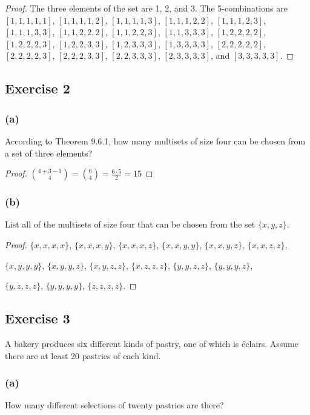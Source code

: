 \documentclass[14pt]{extarticle}
\begin{document}
\begin{proof}
The three elements of the set are 1, 2, and 3. The 5-combinations are \([1, 1, 1, 1, 1]\), \([1, 1, 1, 1, 2]\), 
\([1, 1, 1, 1, 3]\), \([1, 1, 1, 2, 2]\), \([1, 1, 1, 2, 3]\), \([1, 1, 1, 3, 3]\), \([1, 1, 2, 2, 2]\), \([1, 1, 2, 2, 3]\), 
\([1, 1, 3, 3, 3]\), \([1, 2, 2, 2, 2]\), \([1, 2, 2, 2, 3]\), \([1, 2, 2, 3, 3]\), \([1, 2, 3, 3, 3]\), \([1, 3, 3, 3, 3]\), 
\([2, 2, 2, 2, 2]\), \([2, 2, 2, 2, 3]\), \([2, 2, 2, 3, 3]\), \([2, 2, 3, 3, 3]\), \([2, 3, 3, 3, 3]\), and 
\([3, 3, 3, 3, 3]\).
\end{proof}

\subsection{Exercise 2}
\subsubsection{(a)}
According to Theorem 9.6.1, how many multisets of size four can be chosen from a set of three elements?

\begin{proof}
\(\binom{4+3-1}{4} = \binom{6}{4} = \frac{6 \cdot 5}{2} = 15\)
\end{proof}

\subsubsection{(b)}
List all of the multisets of size four that can be chosen from the set \(\{x, y, z\}\).

\begin{proof}
\(\{x, x, x, x\}\), \(\{x, x, x, y\}\), \(\{x, x, x, z\}\),
\(\{x, x, y, y\}\), \(\{x, x, y, z\}\), \(\{x, x, z, z\}\),

\(\{x, y, y, y\}\), \(\{x, y, y, z\}\), \(\{x, y, z, z\}\),
\(\{x, z, z, z\}\), \(\{y, y, z, z\}\), \(\{y, y, y, z\}\),

\(\{y, z, z, z\}\), \(\{y, y, y, y\}\), \(\{z, z, z, z\}\).
\end{proof}

\subsection{Exercise 3}
A bakery produces six different kinds of pastry, one of which is éclairs. Assume there are at least 20 pastries of each 
kind.

\subsubsection{(a)}
How many different selections of twenty pastries are there?
\end{document}
